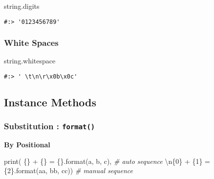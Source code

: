 \documentclass[
]{book}
\newenvironment{Shaded}{\begin{snugshade}}{\end{snugshade}}
\newcommand{\BuiltInTok}[1]{#1}
\newcommand{\CharTok}[1]{\textcolor[rgb]{0.5,0.5,0.5}{#1}}
\newcommand{\CommentTok}[1]{\textcolor[rgb]{0.37,0.37,0.37}{\textit{#1}}}
\newcommand{\NormalTok}[1]{#1}
\newcommand{\SpecialCharTok}[1]{\textcolor[rgb]{0,0,0}{#1}}
\newcommand{\StringTok}[1]{\textcolor[rgb]{0.5,0.5,0.5}{#1}}
\begin{document}
\begin{Shaded}
\begin{Highlighting}[]
\NormalTok{string.digits}
\end{Highlighting}
\end{Shaded}

\begin{verbatim}
#:> '0123456789'
\end{verbatim}

\hypertarget{white-spaces}{%
\subsubsection{White Spaces}\label{white-spaces}}

\begin{Shaded}
\begin{Highlighting}[]
\NormalTok{string.whitespace}
\end{Highlighting}
\end{Shaded}

\begin{verbatim}
#:> ' \t\n\r\x0b\x0c'
\end{verbatim}

\hypertarget{instance-methods}{%
\subsection{Instance Methods}\label{instance-methods}}

\hypertarget{substitution-format}{%
\subsubsection{\texorpdfstring{Substitution : \textbf{\texttt{format()}}}{Substitution : format()}}\label{substitution-format}}

\textbf{By Positional}

\begin{Shaded}
\begin{Highlighting}[]
\BuiltInTok{print}\NormalTok{( }\StringTok{\textquotesingle{}}\SpecialCharTok{\{\}}\StringTok{ + }\SpecialCharTok{\{\}}\StringTok{ = }\SpecialCharTok{\{\}}\StringTok{\textquotesingle{}}\NormalTok{.}\BuiltInTok{format}\NormalTok{(}\StringTok{\textquotesingle{}a\textquotesingle{}}\NormalTok{, }\StringTok{\textquotesingle{}b\textquotesingle{}}\NormalTok{, }\StringTok{\textquotesingle{}c\textquotesingle{}}\NormalTok{),         }\CommentTok{\# auto sequence}
       \StringTok{\textquotesingle{}}\CharTok{\textbackslash{}n}\SpecialCharTok{\{0\}}\StringTok{ + }\SpecialCharTok{\{1\}}\StringTok{ = }\SpecialCharTok{\{2\}}\StringTok{\textquotesingle{}}\NormalTok{.}\BuiltInTok{format}\NormalTok{(}\StringTok{\textquotesingle{}aa\textquotesingle{}}\NormalTok{, }\StringTok{\textquotesingle{}bb\textquotesingle{}}\NormalTok{, }\StringTok{\textquotesingle{}cc\textquotesingle{}}\NormalTok{)) }\CommentTok{\# manual sequence}
\end{Highlighting}
\end{Shaded}
\end{document}

